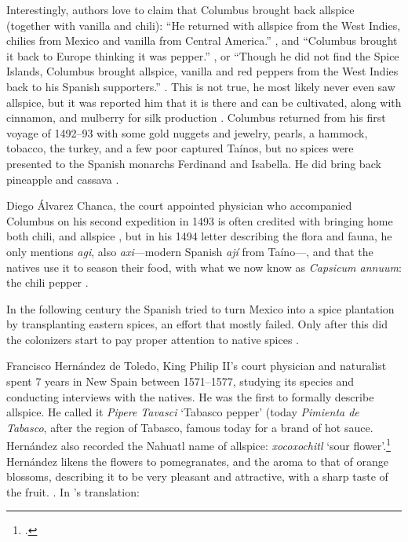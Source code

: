 Interestingly, authors love to claim that Columbus brought back allspice (together with vanilla and chili): ``He returned with allspice from the West Indies, chilies from Mexico and vanilla from Central America.'' \autocite[17]{craze_spice_1997}, and ``Columbus brought it back to Europe thinking it was pepper.'' \autocite[146]{czarra_spices_2009}, or ``Though he did not find the Spice Islands, Columbus brought allspice, vanilla and red peppers from the West Indies back to his Spanish supporters.'' \autocite[1]{parthasarathy_chemistry_2008}. This is not true, he most likely never even saw allspice, but it was reported him that it is there and can be cultivated, along with cinnamon, and mulberry for silk production \autocites[151]{colon_life_1959}. Columbus returned from his first voyage of 1492--93 with some gold nuggets and jewelry, pearls, a hammock, tobacco, the turkey, and a few poor captured Taínos, but no spices were presented to the Spanish monarchs Ferdinand and Isabella. He did bring back pineapple and cassava \autocite[11]{turner_spice_2004}. 

Diego Álvarez Chanca, the court appointed physician who accompanied Columbus on his second expedition in 1493 is often credited with bringing home both chili, and allspice \autocites[]{mccormick_history_nodate}, but in his 1494 letter describing the flora and fauna, he only mentions \textit{agi}, also \textit{axi}---modern Spanish \textit{ají} from Taíno---\autocite[see][34]{corominas_breve_1987}, and that the natives use it to season their food, with what we now know as \textit{Capsicum annuum}: the chili pepper \autocite[311]{chanca_american_2003}.

In the following century the Spanish tried to turn Mexico into a spice plantation by transplanting eastern spices, an effort that mostly failed. Only after this did the colonizers start to pay proper attention to native spices \autocite[6]{machuca_past_2020}. 

Francisco Hernández de Toledo, King Philip II's court physician and naturalist spent 7 years in New Spain between 1571--1577, studying its species and conducting interviews with the natives. He was the first to formally describe allspice. He called it \textit{Pipere Tavasci} `Tabasco pepper' (today \textit{Pimienta de Tabasco}, after the region of Tabasco, famous today for a brand of hot sauce. Hernández also recorded the Nahuatl name of allspice: \textit{xocoxochitl} `sour flower'.\footcite[cf.][xococ; xochitl]{ond} Hernández likens the flowers to pomegranates, and the aroma to that of orange blossoms, describing it to be very pleasant and attractive, with a sharp taste of the fruit. \autocite[2]{hernandez_cuatro_1615}. In \textcite{machuca_past_2020}'s translation:

